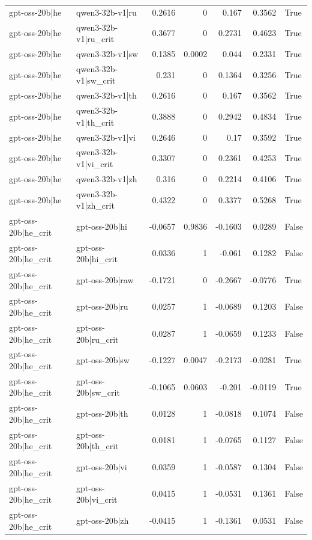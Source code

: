 \begin{table}
\begin{tabular}{l l r r r r l}
gpt-oss-20b|he & qwen3-32b-v1|ru & 0.2616 & 0 & 0.167 & 0.3562 & True \\
gpt-oss-20b|he & qwen3-32b-v1|ru_crit & 0.3677 & 0 & 0.2731 & 0.4623 & True \\
gpt-oss-20b|he & qwen3-32b-v1|sw & 0.1385 & 0.0002 & 0.044 & 0.2331 & True \\
gpt-oss-20b|he & qwen3-32b-v1|sw_crit & 0.231 & 0 & 0.1364 & 0.3256 & True \\
gpt-oss-20b|he & qwen3-32b-v1|th & 0.2616 & 0 & 0.167 & 0.3562 & True \\
gpt-oss-20b|he & qwen3-32b-v1|th_crit & 0.3888 & 0 & 0.2942 & 0.4834 & True \\
gpt-oss-20b|he & qwen3-32b-v1|vi & 0.2646 & 0 & 0.17 & 0.3592 & True \\
gpt-oss-20b|he & qwen3-32b-v1|vi_crit & 0.3307 & 0 & 0.2361 & 0.4253 & True \\
gpt-oss-20b|he & qwen3-32b-v1|zh & 0.316 & 0 & 0.2214 & 0.4106 & True \\
gpt-oss-20b|he & qwen3-32b-v1|zh_crit & 0.4322 & 0 & 0.3377 & 0.5268 & True \\
gpt-oss-20b|he_crit & gpt-oss-20b|hi & -0.0657 & 0.9836 & -0.1603 & 0.0289 & False \\
gpt-oss-20b|he_crit & gpt-oss-20b|hi_crit & 0.0336 & 1 & -0.061 & 0.1282 & False \\
gpt-oss-20b|he_crit & gpt-oss-20b|raw & -0.1721 & 0 & -0.2667 & -0.0776 & True \\
gpt-oss-20b|he_crit & gpt-oss-20b|ru & 0.0257 & 1 & -0.0689 & 0.1203 & False \\
gpt-oss-20b|he_crit & gpt-oss-20b|ru_crit & 0.0287 & 1 & -0.0659 & 0.1233 & False \\
gpt-oss-20b|he_crit & gpt-oss-20b|sw & -0.1227 & 0.0047 & -0.2173 & -0.0281 & True \\
gpt-oss-20b|he_crit & gpt-oss-20b|sw_crit & -0.1065 & 0.0603 & -0.201 & -0.0119 & True \\
gpt-oss-20b|he_crit & gpt-oss-20b|th & 0.0128 & 1 & -0.0818 & 0.1074 & False \\
gpt-oss-20b|he_crit & gpt-oss-20b|th_crit & 0.0181 & 1 & -0.0765 & 0.1127 & False \\
gpt-oss-20b|he_crit & gpt-oss-20b|vi & 0.0359 & 1 & -0.0587 & 0.1304 & False \\
gpt-oss-20b|he_crit & gpt-oss-20b|vi_crit & 0.0415 & 1 & -0.0531 & 0.1361 & False \\
gpt-oss-20b|he_crit & gpt-oss-20b|zh & -0.0415 & 1 & -0.1361 & 0.0531 & False \\

\end{tabular}
\end{table}
